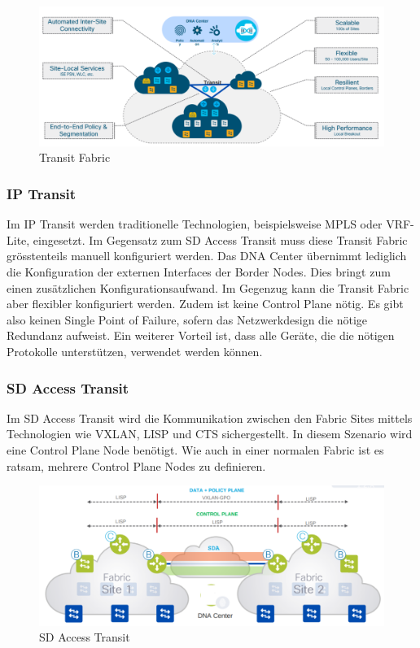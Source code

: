 \begin{figure}[H]
	\centering
	\includegraphics[width=0.8\linewidth]{img/Absicherung/Transit-Fabric.png}
	\caption{Transit Fabric \cite{transit-fabric} }
	\label{fig:Transit Fabric}
\end{figure}

\subsubsection{IP Transit}

Im IP Transit werden traditionelle Technologien, beispielsweise MPLS oder VRF-Lite, eingesetzt. Im Gegensatz zum SD Access Transit muss diese Transit Fabric grösstenteils manuell konfiguriert werden. Das DNA Center übernimmt lediglich die Konfiguration der externen Interfaces der Border Nodes. 
Dies bringt zum einen zusätzlichen Konfigurationsaufwand. Im Gegenzug kann die Transit Fabric aber flexibler konfiguriert werden. Zudem ist keine Control Plane nötig. Es gibt also keinen Single Point of Failure, sofern das Netzwerkdesign die nötige Redundanz aufweist.
Ein weiterer Vorteil ist, dass alle Geräte, die die nötigen Protokolle unterstützen, verwendet werden können.

\subsubsection{SD Access Transit}

Im SD Access Transit wird die Kommunikation zwischen den Fabric Sites mittels Technologien wie VXLAN, LISP und CTS sichergestellt. In diesem Szenario wird eine Control Plane Node benötigt. Wie auch in einer normalen Fabric ist es ratsam, mehrere Control Plane Nodes zu definieren. 

\begin{figure}[H]
	\centering
	\includegraphics[width=0.8\linewidth]{img/Absicherung/SD-Access-Transit.png}
	\caption{SD Access Transit \cite{transit-fabric} }
	\label{fig:SD Access Transit}
\end{figure}

